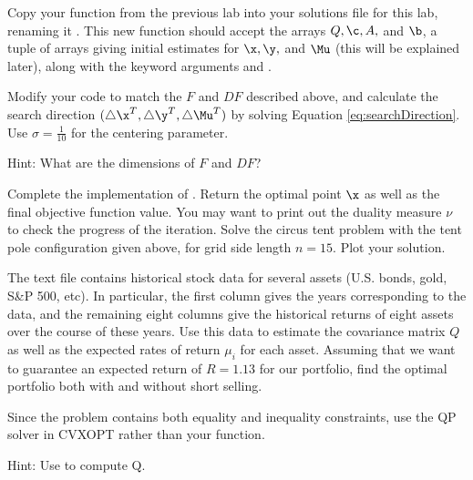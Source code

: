 
Copy your  function from the previous lab into your solutions file for this lab, renaming it .
This new function should accept the arrays $Q, \c, A,$ and $\b$, a tuple of arrays  giving initial estimates for $\x, \y,$ and $\Mu$ (this will be explained later), along with the keyword arguments  and .

Modify your code to match the $F$ and $DF$ described above, and calculate the search direction $(\triangle \x^T, \triangle \y^T, \triangle \Mu^T)$ by solving Equation \ref{eq:searchDirection}.
Use $\sigma = \frac{1}{10}$ for the centering parameter.

Hint: What are the dimensions of $F$ and $DF$?

Complete the implementation of .
Return the optimal point $\x$ as well as the final objective function value.
You may want to print out the duality measure $\nu$ to check the progress of the iteration.
% 
Solve the circus tent problem with the tent pole configuration given above, for grid side length $n = 15$.
Plot your solution.

The text file  contains historical stock data for several assets (U.S. bonds, gold, S\&P 500, etc).
In particular, the first column gives the years corresponding to the data, and the remaining eight columns give the historical returns
of eight assets over the course of these years.
Use this data to estimate the covariance matrix $Q$ as well as the expected rates of return $\mu_i$ for each asset.
Assuming that we want to guarantee an expected return of $R = 1.13$ for our portfolio, find the optimal portfolio both with and without short selling.

Since the problem contains both equality and inequality constraints, use the QP solver in CVXOPT rather than your  function.

Hint: Use  to compute Q.
